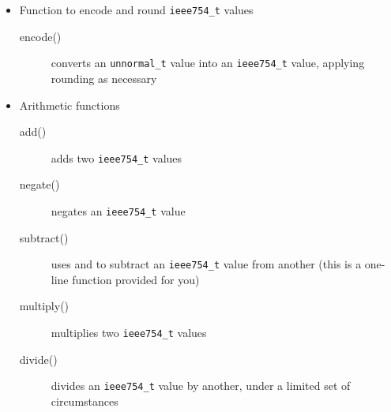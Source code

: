 \begin{itemize}
    \item Function to encode and round \lstinline{ieee754_t} values
    \begin{description}
        \item[encode()] converts an \lstinline{unnormal_t} value into an \lstinline{ieee754_t} value, applying rounding as necessary
    \end{description}
    \item Arithmetic functions
    \begin{description}
        \item[add()] adds two \lstinline{ieee754_t} values
        \item[negate()] negates an \lstinline{ieee754_t} value
        \item[subtract()] uses  and  to subtract an \lstinline{ieee754_t} value from another (this is a one-line function provided for you)
        \item[multiply()] multiplies two \lstinline{ieee754_t} values
        \item[divide()] divides an \lstinline{ieee754_t} value by another, under a limited set of circumstances
    \end{description}
\end{itemize}
